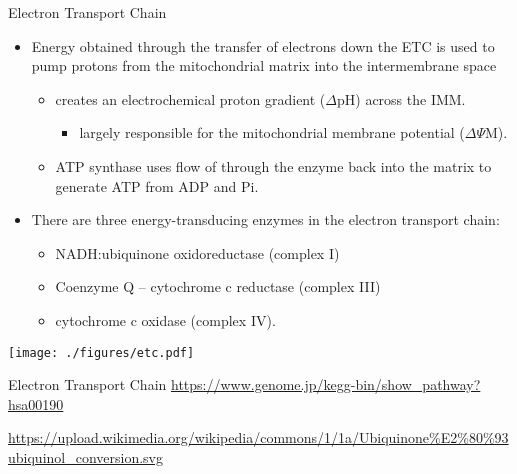 \documentclass[presentation, smaller]{beamer}
\begin{document}
\begin{frame}[label={sec:orgbe5c7f3}]{Electron Transport Chain}
\begin{itemize}
\item Energy obtained through the transfer of electrons down the ETC is
used to pump protons from the mitochondrial matrix into the
intermembrane space
\begin{itemize}
\item creates an electrochemical proton gradient (\(\Delta\)pH) across the IMM.
\begin{itemize}
\item largely responsible for the mitochondrial membrane potential (\(\Delta \Psi\)M).
\end{itemize}
\item ATP synthase uses flow of  through the enzyme back into the
matrix to generate ATP from ADP and Pi.
\end{itemize}
\item There are three energy-transducing enzymes in the electron transport
chain:
\begin{itemize}
\item NADH:ubiquinone oxidoreductase (complex I)
\item Coenzyme Q – cytochrome c reductase (complex III)
\item cytochrome c oxidase (complex IV).
\end{itemize}
\end{itemize}

\begin{center}
\texttt{[image: ./figures/etc.pdf]}
\end{center}
\end{frame}

\begin{frame}[label={sec:orgd6393ac}]{Electron Transport Chain}
\url{https://www.genome.jp/kegg-bin/show\_pathway?hsa00190}

\url{https://upload.wikimedia.org/wikipedia/commons/1/1a/Ubiquinone\%E2\%80\%93ubiquinol\_conversion.svg}
\end{frame}
\end{document}
